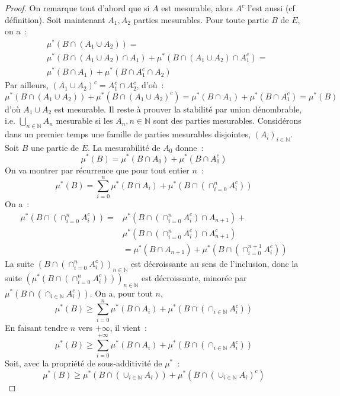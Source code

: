 \begin{proof}
On remarque tout d'abord que si $A$ est mesurable, alors $A^c$ l'est
aussi (cf définition). Soit maintenant $A_1,A_2$ parties
mesurables. Pour toute partie $B$ de $E$, on a~:
\begin{align*}
& \mu^*(B\cap (A_1 \cup A_2)) = \\
&\mu^*(B\cap (A_1 \cup A_2) \cap A_1) +
\mu^*(B\cap (A_1 \cup A_2) \cap A_1^c) = \\
&  \mu^*(B \cap A_1) + \mu^*(B
\cap A_1^c \cap A_2)
\end{align*}
Par ailleurs, $(A_1 \cup A_2)^c = A_1^c \cap A_2^c$, d'où~:
\[
\mu^*(B\cap (A_1 \cup A_2)) + \mu^*(B\cap (A_1 \cup A_2)^c) = 
\mu^*(B\cap A_1) + \mu^*(B \cap A_1^c) = \mu^*(B) 
\]
d'où $A_1 \cup A_2$ est mesurable. 
Il reste à prouver la stabilité par union dénombrable, i.e. $\bigcup_{n \in
\mathbb{N}} A_n$ mesurable si les $A_n,n \in \mathbb{N}$ sont des parties
mesurables.  
Considérons dans un premier temps une famille de parties mesurables disjointes, $(A_i)_{i \in \mathbb{N}}$. 
Soit $B$ une partie de $E$. La
mesurabilité de $A_0$ donne~:
\[
\mu^*(B) = \mu^*(B\cap A_0)+ \mu^*(B \cap A_0^c)
\]
On va montrer par récurrence que pour tout entier $n$~:
\[
\mu^*(B) = \sum_{i=0}^n \mu^*(B \cap A_i) + \mu^*(B \cap \left (
\cap_{i=0}^n A_i^c \right ))
\]
On a~:
\begin{align*}
\mu^*(B \cap \left (
\cap_{i=0}^n A_i^c \right )) = & \mu^*(B\cap \left (
\cap_{i=0}^n A_i^c \right ) \cap A_{n+1}) + \\
&\mu^*(B \cap \left (
\cap_{i=0}^n A_i^c \right ) \cap A_{n+1}^c) \\
&=  \mu^*(B \cap A_{n+1}) + \mu^*(B \cap \left (
\cap_{i=0}^{n+1} A_i^c \right )) 
\end{align*}
La suite $(B \cap (\cap_{i=0}^n A_i^c))_{n \in \mathbb{N}}$ est
  décroissante au sens de l'inclusion, donc la suite $(\mu^*(B \cap 
  (\cap_{i=0}^n A_i^c)))_{n \in \mathbb{N}}$ est décroissante, minorée
  par $\mu^*(B \cap (\cap_{i \in \mathbb{N}} A_i^c))$. On a, pour tout $n$,
\[
\mu^*(B) \geq \sum_{i=0}^n \mu^*(B \cap A_i) + \mu^*(B \cap \left (
\cap_{i \in \mathbb{N}} A_i^c \right ))
\]
En faisant tendre $n$ vers $+\infty$, il vient~:
\[
\mu^*(B) \geq \sum_{i=0}^{+\infty} \mu^*(B \cap A_i) +  \mu^*(B \cap \left (
\cap_{i \in \mathbb{N}} A_i^c \right ))
\]
Soit, avec la propriété de sous-additivité de $\mu^*$~:
\[
\mu^*(B) \geq \mu^* \left (B \cap \left (\cup_{i \in \mathbb{N}} A_i \right ) \right ) + 
\mu^* \left (B \cap \left (\cup_{i \in \mathbb{N}} A_i \right )^c \right )
\]
\end{proof}

